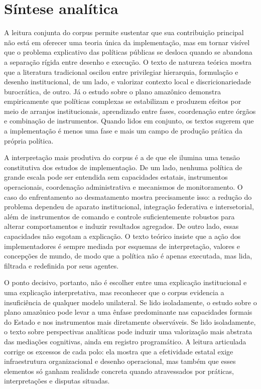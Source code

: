 \documentclass[12pt,a4paper]{article}
\begin{document}
\section{Síntese analítica}
\label{sec:org6f27d0a}

A leitura conjunta do corpus permite sustentar que sua contribuição principal não está em oferecer uma teoria única da implementação, mas em tornar visível que o problema explicativo das políticas públicas se desloca quando se abandona a separação rígida entre desenho e execução. O texto de natureza teórica mostra que a literatura tradicional oscilou entre privilegiar hierarquia, formulação e desenho institucional, de um lado, e valorizar contexto local e discricionariedade burocrática, de outro. Já o estudo sobre o plano amazônico demonstra empiricamente que políticas complexas se estabilizam e produzem efeitos por meio de arranjos institucionais, aprendizado entre fases, coordenação entre órgãos e combinação de instrumentos. Quando lidos em conjunto, os textos sugerem que a implementação é menos uma fase e mais um campo de produção prática da própria política. \parencite{ascenzi2013_implementacao_politicas,mello2017_evolucao_plano}

A interpretação mais produtiva do corpus é a de que ele ilumina uma tensão constitutiva dos estudos de implementação. De um lado, nenhuma política de grande escala pode ser entendida sem capacidades estatais, instrumentos operacionais, coordenação administrativa e mecanismos de monitoramento. O caso do enfrentamento ao desmatamento mostra precisamente isso: a redução do problema dependeu de aparato institucional, integração federativa e intersetorial, além de instrumentos de comando e controle suficientemente robustos para alterar comportamentos e induzir resultados agregados. De outro lado, essas capacidades não esgotam a explicação. O texto teórico insiste que a ação dos implementadores é sempre mediada por esquemas de interpretação, valores e concepções de mundo, de modo que a política não é apenas executada, mas lida, filtrada e redefinida por seus agentes. \parencite{mello2017_evolucao_plano,ascenzi2013_implementacao_politicas}

O ponto decisivo, portanto, não é escolher entre uma explicação institucional e uma explicação interpretativa, mas reconhecer que o corpus evidencia a insuficiência de qualquer modelo unilateral. Se lido isoladamente, o estudo sobre o plano amazônico pode levar a uma ênfase predominante nas capacidades formais do Estado e nos instrumentos mais diretamente observáveis. Se lido isoladamente, o texto sobre perspectivas analíticas pode induzir uma valorização mais abstrata das mediações cognitivas, ainda em registro programático. A leitura articulada corrige os excessos de cada polo: ela mostra que a efetividade estatal exige infraestrutura organizacional e desenho operacional, mas também que esses elementos só ganham realidade concreta quando atravessados por práticas, interpretações e disputas situadas. \parencite{mello2017_evolucao_plano,ascenzi2013_implementacao_politicas}
\end{document}
